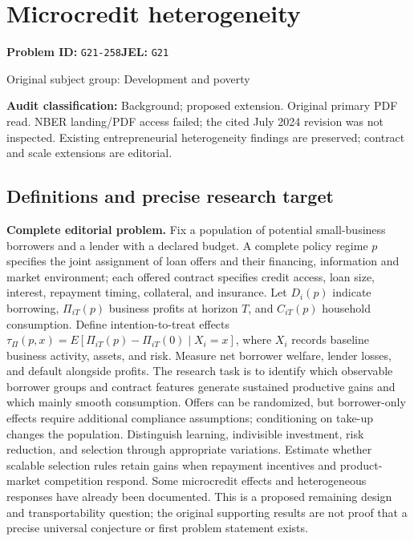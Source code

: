 \documentclass[11pt,a4paper]{article}
\begin{document}
\section*{Microcredit heterogeneity}
\textbf{Problem ID:} \texttt{G21-258}\quad \textbf{JEL:} \texttt{G21}\par
\label{problem:OP-0373}
\label{audited:ECON-085}
{\sffamily\small\color{muted}Original subject group: Development and poverty\par}
\label{definitions:problem:30007655}
\textbf{Audit classification:} Background; proposed extension. Original primary PDF read. NBER landing/PDF access failed; the cited July 2024 revision was not inspected. Existing entrepreneurial heterogeneity findings are preserved; contract and scale extensions are editorial.
\subsection*{Definitions and precise research target}
\textbf{Complete editorial problem.} Fix a population of potential small-business borrowers and a lender with a declared budget. A complete policy regime \(p\) specifies the joint assignment of loan offers and their financing, information and market environment; each offered contract specifies credit access, loan size, interest, repayment timing, collateral, and insurance. Let \(D_i(p)\) indicate borrowing, \(\Pi_{iT}(p)\) business profits at horizon \(T\), and \(C_{iT}(p)\) household consumption. Define intention-to-treat effects \(\tau_\Pi(p,x)=E[\Pi_{iT}(p)-\Pi_{iT}(0)\mid X_i=x]\), where \(X_i\) records baseline business activity, assets, and risk. Measure net borrower welfare, lender losses, and default alongside profits. The research task is to identify which observable borrower groups and contract features generate sustained productive gains and which mainly smooth consumption. Offers can be randomized, but borrower-only effects require additional compliance assumptions; conditioning on take-up changes the population. Distinguish learning, indivisible investment, risk reduction, and selection through appropriate variations. Estimate whether scalable selection rules retain gains when repayment incentives and product-market competition respond. Some microcredit effects and heterogeneous responses have already been documented. This is a proposed remaining design and transportability question; the original supporting results are not proof that a precise universal conjecture or first problem statement exists.
\end{document}
